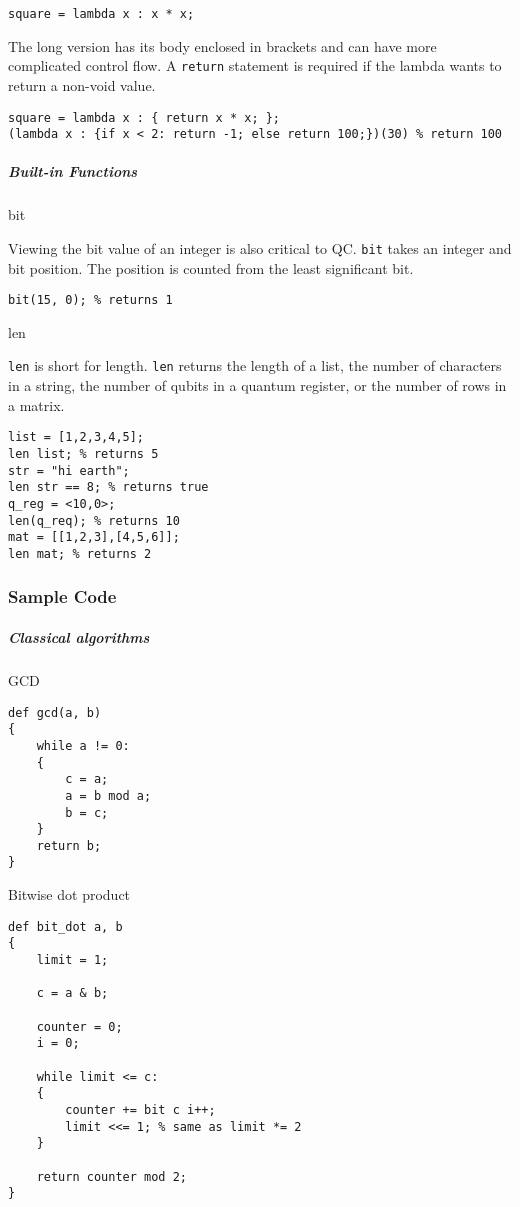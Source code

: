 \documentclass[]{article}
\begin{document}
\begin{verbatim}
square = lambda x : x * x;
\end{verbatim}

The long version has its body enclosed in brackets and can have more
complicated control flow. A \texttt{return} statement is required if the
lambda wants to return a non-void value.

\begin{verbatim}
square = lambda x : { return x * x; };
(lambda x : {if x < 2: return -1; else return 100;})(30) % return 100
\end{verbatim}

\subparagraph{Built-in Functions}\label{built-in-functions}

bit

Viewing the bit value of an integer is also critical to QC. \texttt{bit}
takes an integer and bit position. The position is counted from the
least significant bit.

\begin{verbatim}
bit(15, 0); % returns 1
\end{verbatim}

len

\texttt{len} is short for length. \texttt{len} returns the length of a
list, the number of characters in a string, the number of qubits in a
quantum register, or the number of rows in a matrix.

\begin{verbatim}
list = [1,2,3,4,5];
len list; % returns 5
str = "hi earth";
len str == 8; % returns true
q_reg = <10,0>;
len(q_req); % returns 10
mat = [[1,2,3],[4,5,6]];
len mat; % returns 2
\end{verbatim}

\subsubsection{Sample Code}\label{sample-code}

\subparagraph{Classical algorithms}\label{classical-algorithms}

GCD

\begin{verbatim}
def gcd(a, b)
{
    while a != 0:
    {
        c = a;
        a = b mod a;
        b = c;
    }
    return b;
}
\end{verbatim}

Bitwise dot product

\begin{verbatim}
def bit_dot a, b
{
    limit = 1;

    c = a & b;

    counter = 0;
    i = 0;

    while limit <= c:
    {
        counter += bit c i++;
        limit <<= 1; % same as limit *= 2
    }

    return counter mod 2;
}
\end{verbatim}
\end{document}
